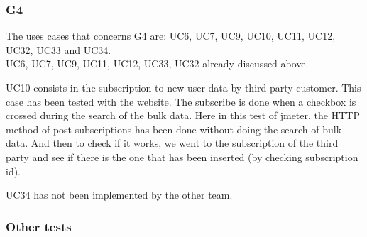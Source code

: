 \subsubsection{G4}
The uses cases that concerns G4 are: UC6, UC7, UC9, UC10, UC11, UC12, UC32, UC33 and UC34. \\

UC6, UC7, UC9, UC11, UC12, UC33, UC32 already discussed above.

\par 
UC10 consists in the subscription to new user data by third party customer. This case has been tested with the website. The subscribe is done when a checkbox is crossed during the search of the bulk data. Here in this test of jmeter, the HTTP method of post subscriptions has been done without doing the search of bulk data. And then to check if it works, we went to the subscription of the third party and see if there is the one that has been inserted (by checking subscription id).

\par 
UC34 has not been implemented by the other team.

\subsubsection{Other tests}